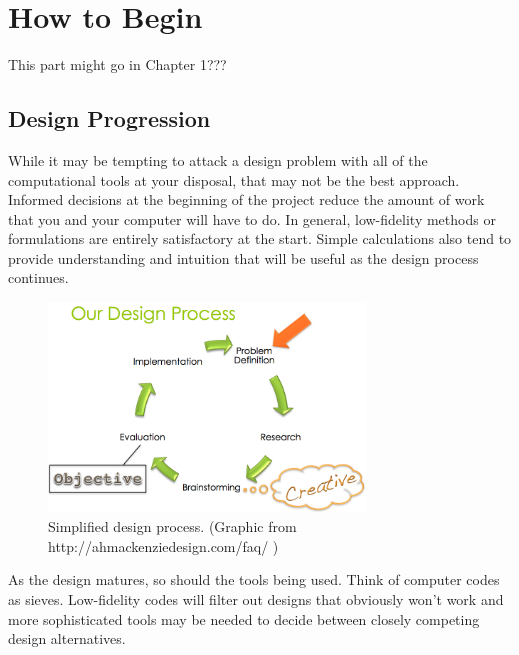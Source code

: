 \chapter{How to Begin}
This part might go in Chapter 1???

\section{Design Progression}
While it may be tempting to attack a design problem with all of the computational tools at your disposal, that may not be the best approach. Informed decisions at the beginning of the project reduce the amount of work that you and your computer will have to do. 
In general, low-fidelity methods or formulations are entirely satisfactory at the start. Simple calculations also tend to provide understanding and intuition that will be useful as the design process continues.

\begin{figure}[!hb]
  \label{fig:linear_design}
  \centering
  \includegraphics[width=0.75\textwidth]{graphics/design_process_big.png}
  \caption{Simplified design process. (Graphic from http://ahmackenziedesign.com/faq/ )}
\end{figure}

As the design matures, so should the tools being used. Think of computer codes as sieves. Low-fidelity codes will filter out designs that obviously won't work and more sophisticated tools may be needed to decide between closely competing design alternatives.

